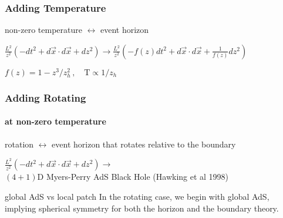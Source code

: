 \documentclass{beamer}
\begin{document}
\begin{frame}
  \frametitle{Adding Temperature}

  \begin{block}{}non-zero temperature $\longleftrightarrow$ event horizon\end{block}

  \begin{block}{}
    $\frac {L^2}{z^2} \left( -dt^2 + d\vec x\cdot d\vec x + dz^2 \right) \rightarrow \frac {L^2}{z^2} \left( -f(z) dt^2 + d\vec x\cdot d\vec x + \frac 1{f(z)}dz^2 \right)$

    $ f(z) = 1 - z^3/z_h^2\,, \quad \mathrm T \propto 1/z_h $
  \end{block}


\end{frame}

\begin{frame}
  \frametitle{Adding Rotating}
  \framesubtitle{at non-zero temperature}

  \begin{block}{}rotation $\longleftrightarrow$ event horizon that rotates relative to the boundary\end{block}

  \begin{block}{}
    $\frac {L^2}{z^2} \left( -dt^2 + d\vec x\cdot d\vec x + dz^2 \right) \rightarrow$ \\$(4+1)$D Myers-Perry AdS Black Hole (Hawking et al 1998)
  \end{block}

  \begin{alertblock}{global AdS vs local patch}
    In the rotating case, we begin with global AdS, implying spherical symmetry for both the horizon and the boundary theory.
  \end{alertblock}


\end{frame}
\end{document}
